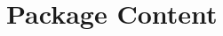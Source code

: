 \documentclass[
  DIV=calc,
  BCOR=5mm,
  12pt,
  headings=small,
  oneside,
  abstract=true,
  toc=bib,
  xcolor=dvipsnames,
  openany,
  ngerman,english]{scrartcl}
\begin{document}
\section{Package Content}
















%
\printnomenclature


\end{document}
